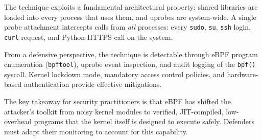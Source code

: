 \documentclass[11pt,a4paper]{article}
\begin{document}
The technique exploits a fundamental architectural property: shared libraries
are loaded into every process that uses them, and uprobes are system-wide. A
single probe attachment intercepts calls from \textit{all} processes: every
\texttt{sudo}, \texttt{su}, \texttt{ssh} login, \texttt{curl} request, and
Python HTTPS call on the system.

From a defensive perspective, the technique is detectable through eBPF program
enumeration (\texttt{bpftool}), uprobe event inspection, and audit logging of
the \texttt{bpf()} syscall. Kernel lockdown mode, mandatory access control
policies, and hardware-based authentication provide effective mitigations.

The key takeaway for security practitioners is that eBPF has shifted the
attacker's toolkit from noisy kernel modules to verified, JIT-compiled,
low-overhead programs that the kernel itself is designed to execute safely.
Defenders must adapt their monitoring to account for this capability.


\newpage
\printbibliography[title={References}]
\end{document}
